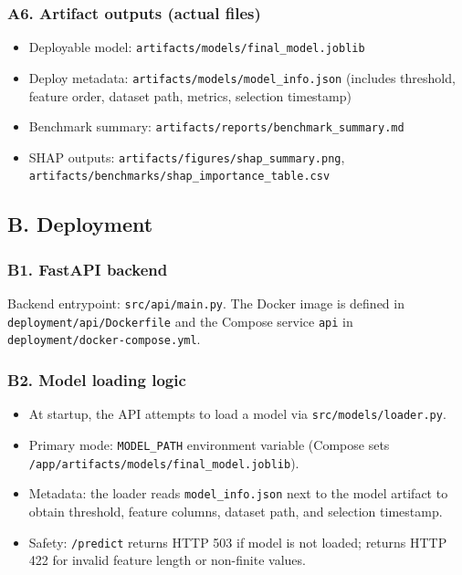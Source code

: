\documentclass[11pt]{article}
\newcommand{\code}[1]{\texttt{#1}}
\begin{document}
\subsubsection*{A6. Artifact outputs (actual files)}
\begin{itemize}
  \item Deployable model: \code{artifacts/models/final\_model.joblib}
  \item Deploy metadata: \code{artifacts/models/model\_info.json} (includes threshold, feature order, dataset path, metrics, selection timestamp)
  \item Benchmark summary: \code{artifacts/reports/benchmark\_summary.md}
  \item SHAP outputs: \code{artifacts/figures/shap\_summary.png}, \code{artifacts/benchmarks/shap\_importance\_table.csv}
\end{itemize}

\subsection*{B. Deployment}

\subsubsection*{B1. FastAPI backend}
Backend entrypoint: \code{src/api/main.py}. The Docker image is defined in \code{deployment/api/Dockerfile} and the Compose service \code{api} in \code{deployment/docker-compose.yml}.

\subsubsection*{B2. Model loading logic}
\begin{itemize}
  \item At startup, the API attempts to load a model via \code{src/models/loader.py}.
  \item Primary mode: \code{MODEL\_PATH} environment variable (Compose sets \code{/app/artifacts/models/final\_model.joblib}).
  \item Metadata: the loader reads \code{model\_info.json} next to the model artifact to obtain threshold, feature columns, dataset path, and selection timestamp.
  \item Safety: \code{/predict} returns HTTP 503 if model is not loaded; returns HTTP 422 for invalid feature length or non-finite values.
\end{itemize}
\end{document}
